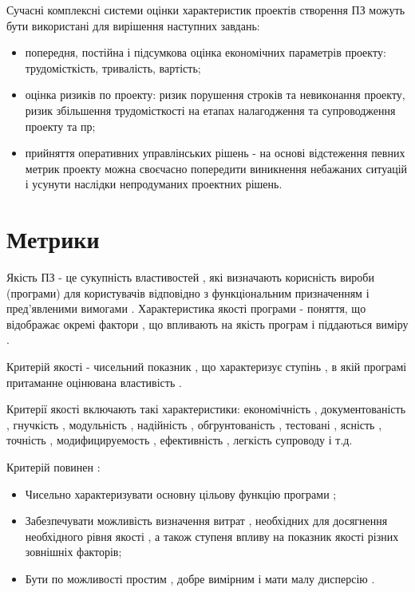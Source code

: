\documentclass[oneside,final,14pt]{extreport}
\begin{document}
Сучасні комплексні системи оцінки характеристик проектів створення ПЗ можуть бути використані для вирішення наступних завдань:
\begin{itemize}
\item {} 
попередня, постійна і підсумкова оцінка економічних параметрів проекту: трудомісткість, тривалість, вартість;

\item {} 
оцінка ризиків по проекту: ризик порушення строків та невиконання проекту, ризик збільшення трудомісткості на етапах налагодження та супроводження проекту та пр;

\item {} 
прийняття оперативних управлінських рішень - на основі відстеження певних метрик проекту можна своєчасно попередити виникнення небажаних ситуацій і усунути наслідки непродуманих проектних рішень.

\end{itemize}


\section{Метрики}
\label{2section:id3}
Якість ПЗ - це сукупність властивостей , які визначають корисність вироби (програми) для користувачів відповідно з функціональним призначенням і пред'явленими вимогами .
Характеристика якості програми - поняття, що відображає окремі фактори , що впливають на якість програм і піддаються виміру .

Критерій якості - чисельний показник , що характеризує ступінь , в якій програмі притаманне оцінювана властивість .

Критерії якості включають такі характеристики: економічність , документованість , гнучкість , модульність , надійність , обгрунтованість , тестовані , ясність , точність , модифицируемость , ефективність , легкість супроводу і т.д.

Критерій повинен :
\begin{itemize}
\item {} 
Чисельно характеризувати основну цільову функцію програми ;

\item {} 
Забезпечувати можливість визначення витрат , необхідних для досягнення необхідного рівня якості , а також ступеня впливу на показник якості різних зовнішніх факторів;

\item {} 
Бути по можливості простим , добре вимірним і мати малу дисперсію .

\end{itemize}
\end{document}
